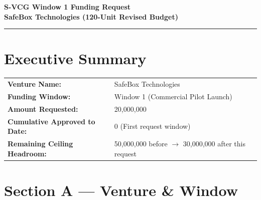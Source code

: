 \documentclass[11pt,a4paper]{article}
\begin{document}
\begin{center}
    {\LARGE \textbf{S-VCG Window 1 Funding Request}} \\
    \vspace{0.2cm}
    {\large \textbf{SafeBox Technologies (120-Unit Revised Budget)}} \\
    \vspace{0.1cm}
    \rule{\linewidth}{1pt}
\end{center}

\vspace{0.2cm}

\section*{Executive Summary}
\begin{tabular}{ll}
    \textbf{Venture Name:} & SafeBox Technologies \\
    \textbf{Funding Window:} & Window 1 (Commercial Pilot Launch) \\
    \textbf{Amount Requested:} & \text{₦}20,000,000 \\
    \textbf{Cumulative Approved to Date:} & \text{₦}0 (First request window) \\
    \textbf{Remaining Ceiling Headroom:} & \text{₦}50,000,000 before $\rightarrow$ \text{₦}30,000,000 after this request \\
\end{tabular}

\vspace{0.5cm}

\section{Section A --- Venture \& Window}
\end{document}
